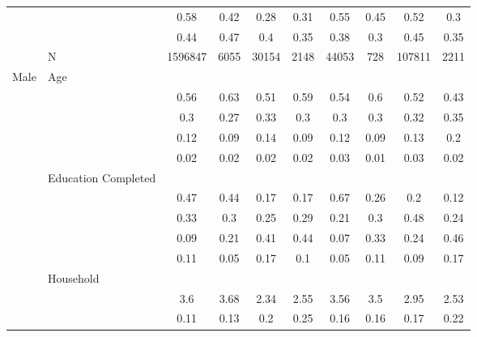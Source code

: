\documentclass[
]{article}
\begin{document}
\begin{landscape}
\begin{table}[ht]
\begin{tabular}{l>{\raggedright\arraybackslash}p{3.2cm}|cccccccc}
   & \multicolumn{1}{>{\raggedleft\arraybackslash}p{2.9cm}|}{\makebox[2.9cm][r]{Lives with Child }} & 0.58 & 0.42 & 0.28 & 0.31 & 0.55 & 0.45 & 0.52 & 0.3 \\ 
   & \multicolumn{1}{>{\raggedleft\arraybackslash}p{3.4cm}|}{\makebox[3.4cm][r]{Married/Cohabiting }} & 0.44 & 0.47 & 0.4 & 0.35 & 0.38 & 0.3 & 0.45 & 0.35 \\ 
   & N & 1596847 & 6055 & 30154 & 2148 & 44053 & 728 & 107811 & 2211 \\ 
  Male & Age &  &  &  &  &  &  &  &  \\ 
   & \multicolumn{1}{>{\raggedleft\arraybackslash}p{1.5cm}|}{\makebox[1.5cm][r]{60 - 69 }} & 0.56 & 0.63 & 0.51 & 0.59 & 0.54 & 0.6 & 0.52 & 0.43 \\ 
   & \multicolumn{1}{>{\raggedleft\arraybackslash}p{1.5cm}|}{\makebox[1.5cm][r]{70 - 79 }} & 0.3 & 0.27 & 0.33 & 0.3 & 0.3 & 0.3 & 0.32 & 0.35 \\ 
   & \multicolumn{1}{>{\raggedleft\arraybackslash}p{1.5cm}|}{\makebox[1.5cm][r]{80 - 89 }} & 0.12 & 0.09 & 0.14 & 0.09 & 0.12 & 0.09 & 0.13 & 0.2 \\ 
   & \multicolumn{1}{>{\raggedleft\arraybackslash}p{1.5cm}|}{\makebox[1.5cm][r]{90 plus }} & 0.02 & 0.02 & 0.02 & 0.02 & 0.03 & 0.01 & 0.03 & 0.02 \\ 
   & Education Completed &  &  &  &  &  &  &  &  \\ 
   & \multicolumn{1}{>{\raggedleft\arraybackslash}p{3.2cm}|}{\makebox[3.2cm][r]{Less than Primary }} & 0.47 & 0.44 & 0.17 & 0.17 & 0.67 & 0.26 & 0.2 & 0.12 \\ 
   & \multicolumn{1}{>{\raggedleft\arraybackslash}p{1.7cm}|}{\makebox[1.7cm][r]{Primary }} & 0.33 & 0.3 & 0.25 & 0.29 & 0.21 & 0.3 & 0.48 & 0.24 \\ 
   & \multicolumn{1}{>{\raggedleft\arraybackslash}p{2cm}|}{\makebox[2cm][r]{Secondary }} & 0.09 & 0.21 & 0.41 & 0.44 & 0.07 & 0.33 & 0.24 & 0.46 \\ 
   & \multicolumn{1}{>{\raggedleft\arraybackslash}p{2cm}|}{\makebox[2cm][r]{University }} & 0.11 & 0.05 & 0.17 & 0.1 & 0.05 & 0.11 & 0.09 & 0.17 \\ 
   & Household &  &  &  &  &  &  &  &  \\ 
   & \multicolumn{1}{>{\raggedleft\arraybackslash}p{2.7cm}|}{\makebox[2.7cm][r]{Household Size }} & 3.6 & 3.68 & 2.34 & 2.55 & 3.56 & 3.5 & 2.95 & 2.53 \\ 
   & \multicolumn{1}{>{\raggedleft\arraybackslash}p{2.2cm}|}{\makebox[2.2cm][r]{Lives Alone }} & 0.11 & 0.13 & 0.2 & 0.25 & 0.16 & 0.16 & 0.17 & 0.22 \\ 

\end{tabular}
\end{table}
\end{landscape}
\end{document}
